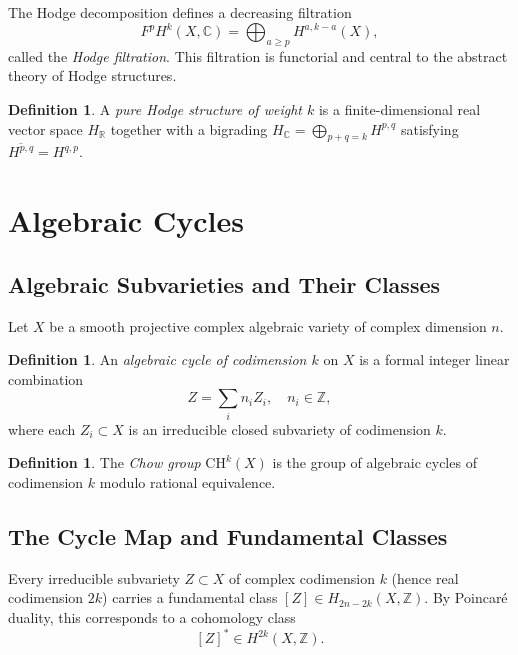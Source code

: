 \documentclass[12pt,a4paper]{amsart}
\theoremstyle{definition}
\newtheorem{definition}[theorem]{Definition}
\theoremstyle{remark}
\begin{document}
The Hodge decomposition defines a decreasing filtration
\[
  F^p H^k(X, \mathbb{C}) = \bigoplus_{a \ge p} H^{a,k-a}(X),
\]
called the \emph{Hodge filtration}. This filtration is functorial and central to
the abstract theory of Hodge structures.

\begin{definition}
A \emph{pure Hodge structure of weight $k$} is a finite-dimensional real vector
space $H_\mathbb{R}$ together with a bigrading $H_\mathbb{C} = \bigoplus_{p+q=k} H^{p,q}$
satisfying $\overline{H^{p,q}} = H^{q,p}$.
\end{definition}

\section{Algebraic Cycles}
\label{sec:cycles}

\subsection{Algebraic Subvarieties and Their Classes}

Let $X$ be a smooth projective complex algebraic variety of complex dimension $n$.

\begin{definition}
An \emph{algebraic cycle of codimension $k$} on $X$ is a formal integer linear
combination
\[
  Z = \sum_{i} n_i Z_i, \quad n_i \in \mathbb{Z},
\]
where each $Z_i \subset X$ is an irreducible closed subvariety of codimension $k$.
\end{definition}

\begin{definition}
The \emph{Chow group} $\mathrm{CH}^k(X)$ is the group of algebraic cycles of
codimension $k$ modulo rational equivalence.
\end{definition}

\subsection{The Cycle Map and Fundamental Classes}

Every irreducible subvariety $Z \subset X$ of complex codimension $k$ (hence real
codimension $2k$) carries a fundamental class $[Z] \in H_{2n-2k}(X, \mathbb{Z})$.
By Poincaré duality, this corresponds to a cohomology class
\[
  [Z]^* \in H^{2k}(X, \mathbb{Z}).
\]
\end{document}
